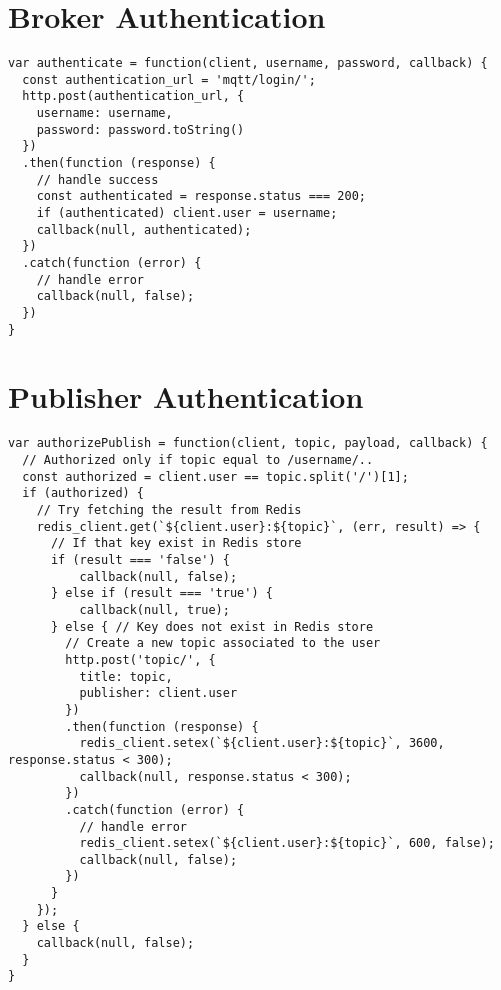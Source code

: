 \newpage
\section{Broker Authentication}
\begin{footnotesize}
\begin{verbatim}
var authenticate = function(client, username, password, callback) {
  const authentication_url = 'mqtt/login/';
  http.post(authentication_url, {
    username: username,
    password: password.toString()
  })
  .then(function (response) {
    // handle success
    const authenticated = response.status === 200;
    if (authenticated) client.user = username;
    callback(null, authenticated);
  })
  .catch(function (error) {
    // handle error
    callback(null, false);
  })
}
\end{verbatim}
\end{footnotesize}

\newpage
\section{Publisher Authentication}
\begin{footnotesize}
\begin{verbatim}
var authorizePublish = function(client, topic, payload, callback) {
  // Authorized only if topic equal to /username/..
  const authorized = client.user == topic.split('/')[1];
  if (authorized) {
    // Try fetching the result from Redis
    redis_client.get(`${client.user}:${topic}`, (err, result) => {
      // If that key exist in Redis store
      if (result === 'false') {
          callback(null, false);
      } else if (result === 'true') {
          callback(null, true);
      } else { // Key does not exist in Redis store
        // Create a new topic associated to the user
        http.post('topic/', {
          title: topic,
          publisher: client.user
        })
        .then(function (response) {
          redis_client.setex(`${client.user}:${topic}`, 3600, response.status < 300);
          callback(null, response.status < 300);
        })
        .catch(function (error) {
          // handle error
          redis_client.setex(`${client.user}:${topic}`, 600, false);
          callback(null, false);
        })
      }
    });
  } else {
    callback(null, false);
  }
}

\end{verbatim}
\end{footnotesize}


\newpage

